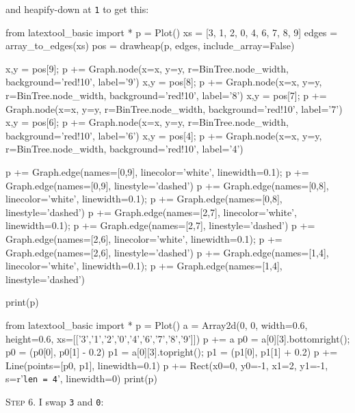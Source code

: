and heapify-down at \texttt{1} to get this:

\begin{python}
from latextool_basic import *
p = Plot()
xs = [3, 1, 2, 0, 4, 6, 7, 8, 9]
edges = array_to_edges(xs)
pos = drawheap(p, edges, include_array=False)

x,y = pos[9]; p += Graph.node(x=x, y=y, r=BinTree.node_width, background='red!10', label='9')
x,y = pos[8]; p += Graph.node(x=x, y=y, r=BinTree.node_width, background='red!10', label='8')
x,y = pos[7]; p += Graph.node(x=x, y=y, r=BinTree.node_width, background='red!10', label='7')
x,y = pos[6]; p += Graph.node(x=x, y=y, r=BinTree.node_width, background='red!10', label='6')
x,y = pos[4]; p += Graph.node(x=x, y=y, r=BinTree.node_width, background='red!10', label='4')

p += Graph.edge(names=[0,9], linecolor='white', linewidth=0.1); p += Graph.edge(names=[0,9], linestyle='dashed')
p += Graph.edge(names=[0,8], linecolor='white', linewidth=0.1); p += Graph.edge(names=[0,8], linestyle='dashed')
p += Graph.edge(names=[2,7], linecolor='white', linewidth=0.1); p += Graph.edge(names=[2,7], linestyle='dashed')
p += Graph.edge(names=[2,6], linecolor='white', linewidth=0.1); p += Graph.edge(names=[2,6], linestyle='dashed')
p += Graph.edge(names=[1,4], linecolor='white', linewidth=0.1); p += Graph.edge(names=[1,4], linestyle='dashed')

print(p)
\end{python}
\begin{python}
from latextool_basic import *
p = Plot()
a = Array2d(0, 0, width=0.6, height=0.6, 
             xs=[['3','1','2','0','4','6','7','8','9']])
p += a
p0 = a[0][3].bottomright(); p0 = (p0[0], p0[1] - 0.2)
p1 = a[0][3].topright(); p1 = (p1[0], p1[1] + 0.2)
p += Line(points=[p0, p1], linewidth=0.1)
p += Rect(x0=0, y0=-1, x1=2, y1=-1, s=r'\texttt{len = 4}', linewidth=0) 
print(p)
\end{python}


\textsc{Step 6}.
I swap \texttt{3} and \texttt{0}:

